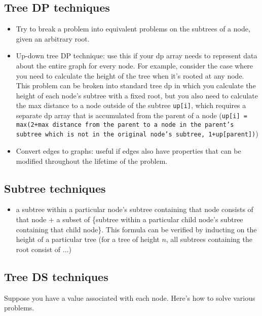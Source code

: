 \documentclass[12pt]{article}
\newcommand{\code}[1]{\texttt{#1}}
\begin{document}
\subsection{Tree DP techniques}
\begin{itemize}
    \item Try to break a problem into equivalent problems on the subtrees of a node, given an arbitrary root.
    \item Up-down tree DP technique: use this if your dp array needs to represent data about the entire graph for every node.
          For example, consider the case where you need to calculate the height of the tree when it's rooted at any node.
          This problem can be broken into standard tree dp in which you calculate the height of each node's subtree with a fixed root,
          but you also need to calculate the max distance to a node outside of the subtree \code{up[i]}, which requires a separate dp array
          that is accumulated from the parent of a node (\code{up[i] = max(2+max distance from the parent to a node in
          the parent's subtree which is not
          in the original node's subtree, 1+up[parent])})
    \item Convert edges to graphs: useful if edges also have properties that can be modified throughout the lifetime of the problem.
\end{itemize}

\subsection{Subtree techniques}
\begin{itemize}
    \item a subtree within a particular node's subtree containing that node consists of that node + 
    a subset of \{subtree within a particular child node's subtree containing that child node\}.
    This formula can be verified by inducting on the height of a particular tree (for a tree of height $n$, 
    all subtrees containing the root consist of $...$)
\end{itemize}

\subsection{Tree DS techniques}
Suppose you have a value associated with each node. Here's how to solve various problems.
\end{document}
